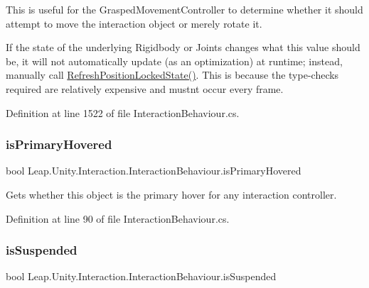 This is useful for the Grasped\+Movement\+Controller to determine whether it should attempt to move the interaction object or merely rotate it.

If the state of the underlying Rigidbody or Joints changes what this value should be, it will not automatically update (as an optimization) at runtime; instead, manually call \mbox{\hyperlink{class_leap_1_1_unity_1_1_interaction_1_1_interaction_behaviour_a33f9f48f2c6375cb926cc94ea2cb6f24}{Refresh\+Position\+Locked\+State()}}. This is because the type-\/checks required are relatively expensive and mustn\textquotesingle{}t occur every frame. 

Definition at line 1522 of file Interaction\+Behaviour.\+cs.

\mbox{\label{class_leap_1_1_unity_1_1_interaction_1_1_interaction_behaviour_a6648c4fe010dec0193cc5ce80a8907fb}} 
\subsubsection{\texorpdfstring{isPrimaryHovered}{isPrimaryHovered}}
{\footnotesize\ttfamily bool Leap.\+Unity.\+Interaction.\+Interaction\+Behaviour.\+is\+Primary\+Hovered\hspace{0.3cm}{\ttfamily [get]}}



Gets whether this object is the primary hover for any interaction controller. 



Definition at line 90 of file Interaction\+Behaviour.\+cs.

\mbox{\label{class_leap_1_1_unity_1_1_interaction_1_1_interaction_behaviour_abd55576df7341d169cbe23eebacc35c5}} 
\subsubsection{\texorpdfstring{isSuspended}{isSuspended}}
{\footnotesize\ttfamily bool Leap.\+Unity.\+Interaction.\+Interaction\+Behaviour.\+is\+Suspended\hspace{0.3cm}{\ttfamily [get]}}



